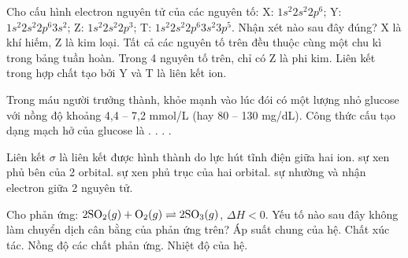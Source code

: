 \documentclass[11pt,a4paper]{article}
\begin{document}
\begin{ex}
Cho cấu hình electron nguyên tử của các nguyên tố: X: $1s^2 2s^2 2p^6$; Y: $1s^2 2s^2 2p^6 3s^2$; Z: $1s^2 2s^2 2p^3$; T: $1s^2 2s^2 2p^6 3s^2 3p^5$. Nhận xét nào sau đây đúng?
\choice
{X là khí hiếm, Z là kim loại.}
{Tất cả các nguyên tố trên đều thuộc cùng một chu kì trong bảng tuần hoàn.}
{Trong 4 nguyên tố trên, chỉ có Z là phi kim.}
{\True Liên kết trong hợp chất tạo bởi Y và T là liên kết ion.}
\end{ex}

\begin{ex}
Trong máu người trưởng thành, khỏe mạnh vào lúc đói có một lượng nhỏ glucose với nồng độ khoảng 4,4 – 7,2 mmol/L (hay 80 – 130 mg/dL). Công thức cấu tạo dạng mạch hở của glucose là
\choice
{\True {}.}
{.}
{.}
{.}
\end{ex}

\begin{ex}
Liên kết $\sigma$ là liên kết được hình thành do
\choice
{lực hút tĩnh điện giữa hai ion.}
{sự xen phủ bên của 2 orbital.}
{\True sự xen phủ trục của hai orbital.}
{sự nhường và nhận electron giữa 2 nguyên tử.}
\end{ex}

\begin{ex}
Cho phản ứng: $2\ce{SO2}(g) + \ce{O2}(g) \rightleftharpoons 2\ce{SO3}(g)$, $\Delta H < 0$. Yếu tố nào sau đây không làm chuyển dịch cân bằng của phản ứng trên?
\choice
{Áp suất chung của hệ.}
{\True Chất xúc tác.}
{Nồng độ các chất phản ứng.}
{Nhiệt độ của hệ.}
\end{ex}
\end{document}
